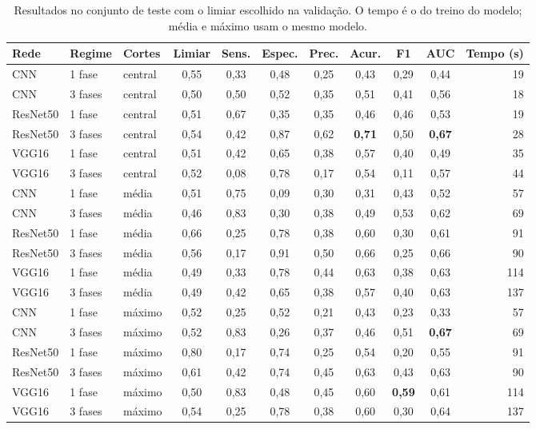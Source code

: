 \documentclass[12pt]{article}
\begin{document}
\begin{table}[ht]
\centering
\caption{Resultados no conjunto de teste com o limiar escolhido na validação. O tempo é o do treino do
modelo; média e máximo usam o mesmo modelo.}
\label{tab:final}
\footnotesize
\setlength{\tabcolsep}{4.5pt}
\begin{tabular}{@{}lllcccccccr@{}}
\toprule
Rede & Regime & Cortes & Limiar & Sens. & Espec. & Prec. & Acur. & F1 & AUC & Tempo (s) \\
\midrule
CNN & 1 fase & central & 0,55 & 0,33 & 0,48 & 0,25 & 0,43 & 0,29 & 0,44 & 19 \\
CNN & 3 fases & central & 0,50 & 0,50 & 0,52 & 0,35 & 0,51 & 0,41 & 0,56 & 18 \\
ResNet50 & 1 fase & central & 0,51 & 0,67 & 0,35 & 0,35 & 0,46 & 0,46 & 0,53 & 19 \\
ResNet50 & 3 fases & central & 0,54 & 0,42 & 0,87 & 0,62 & \textbf{0,71} & 0,50 & \textbf{0,67} & 28 \\
VGG16 & 1 fase & central & 0,51 & 0,42 & 0,65 & 0,38 & 0,57 & 0,40 & 0,49 & 35 \\
VGG16 & 3 fases & central & 0,52 & 0,08 & 0,78 & 0,17 & 0,54 & 0,11 & 0,57 & 44 \\
\midrule
CNN & 1 fase & média & 0,51 & 0,75 & 0,09 & 0,30 & 0,31 & 0,43 & 0,52 & 57 \\
CNN & 3 fases & média & 0,46 & 0,83 & 0,30 & 0,38 & 0,49 & 0,53 & 0,62 & 69 \\
ResNet50 & 1 fase & média & 0,66 & 0,25 & 0,78 & 0,38 & 0,60 & 0,30 & 0,61 & 91 \\
ResNet50 & 3 fases & média & 0,56 & 0,17 & 0,91 & 0,50 & 0,66 & 0,25 & 0,66 & 90 \\
VGG16 & 1 fase & média & 0,49 & 0,33 & 0,78 & 0,44 & 0,63 & 0,38 & 0,63 & 114 \\
VGG16 & 3 fases & média & 0,49 & 0,42 & 0,65 & 0,38 & 0,57 & 0,40 & 0,63 & 137 \\
\midrule
CNN & 1 fase & máximo & 0,52 & 0,25 & 0,52 & 0,21 & 0,43 & 0,23 & 0,33 & 57 \\
CNN & 3 fases & máximo & 0,52 & 0,83 & 0,26 & 0,37 & 0,46 & 0,51 & \textbf{0,67} & 69 \\
ResNet50 & 1 fase & máximo & 0,80 & 0,17 & 0,74 & 0,25 & 0,54 & 0,20 & 0,55 & 91 \\
ResNet50 & 3 fases & máximo & 0,61 & 0,42 & 0,74 & 0,45 & 0,63 & 0,43 & 0,63 & 90 \\
VGG16 & 1 fase & máximo & 0,50 & 0,83 & 0,48 & 0,45 & 0,60 & \textbf{0,59} & 0,61 & 114 \\
VGG16 & 3 fases & máximo & 0,54 & 0,25 & 0,78 & 0,38 & 0,60 & 0,30 & 0,64 & 137 \\
\bottomrule
\end{tabular}
\end{table}
\end{document}

